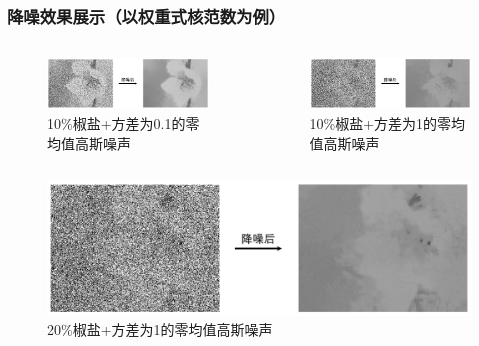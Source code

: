 \documentclass[10pt,aspectratio=43,mathserif]{beamer}
\begin{document}
\begin{frame}
\frametitle{\textbf{降噪效果展示（以权重式核范数为例）}}
\begin{columns}
\begin{figure}
\centering
\includegraphics[scale=0.25]{Screenshot_9.png}
\caption{10\%椒盐+方差为0.1的零均值高斯噪声}
\end{figure}

\begin{figure}
\centering
\includegraphics[scale=0.25]{Screenshot_10.png}
\caption{10\%椒盐+方差为1的零均值高斯噪声}
\end{figure}
\end{columns}
\begin{figure}
\centering
\includegraphics[scale=0.25]{Screenshot_11.png}
\caption{20\%椒盐+方差为1的零均值高斯噪声}
\end{figure}
\end{frame}
\end{document}
